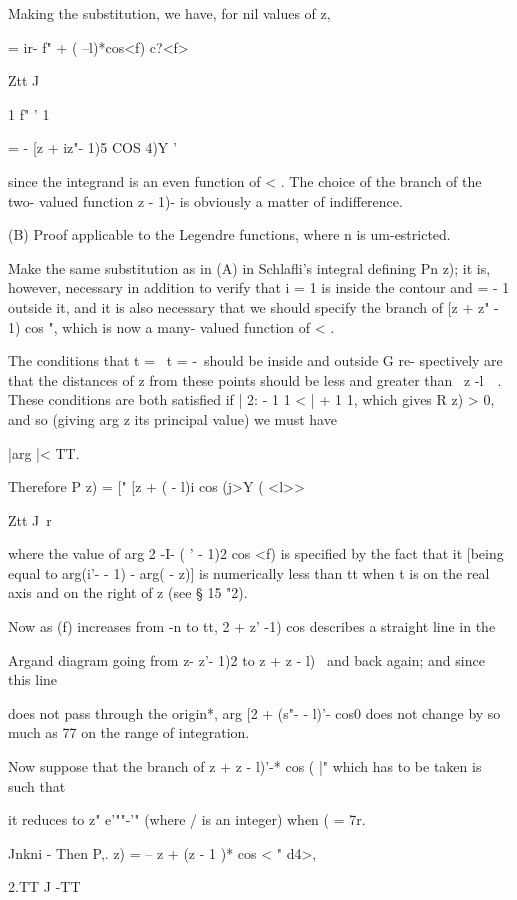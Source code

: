 {{%
%

Making the substitution, we have, for nil values of z,

= ir- f" + ( --l)*cos<f) c?<f>

Ztt J \

1 f" ' 1

= - [z + iz"- 1)5 COS 4)Y '

since the integrand is an even function of < . The choice of the
branch of the two- valued function z - 1)- is obviously a matter of
indifference.

(B) Proof applicable to the Legendre functions, where n is
um-estricted.

Make the same substitution as in (A) in Schlafli's integral defining
Pn z); it is, however, necessary in addition to verify that i = 1 is
inside the contour and = - 1 outside it, and it is also necessary that
we should specify the branch of [z + z" - 1) cos ", which is now a
many- valued function of < .

The conditions that t = \, t = -\ should be inside and outside G re-
spectively are that the distances of z from these points should be
less and greater than \ z -l\ \ . These conditions are both satisfied
if | 2: - 1 1 < | + 1 1, which gives R z) > 0, and so (giving arg z
its principal value) we must have

|arg |< TT.

Therefore P z) = [" [z + ( - l)i cos (j>Y ( <l>>

Ztt J \,r

where the value of arg 2 -I- ( ' - 1)2 cos <f) is specified by the
fact that it [being equal to arg(i'- - 1) - arg( - z)] is numerically
less than tt when t is on the real axis and on the right of z (see §
15 "2).

Now as (f) increases from -n to tt, 2 + z' -1) cos describes a
straight line in the

Argand diagram going from z- z'- 1)2 to z + z - l)~ and back again;
and since this line

does not pass through the origin*, arg [2 + (s"- - l)'- cos0 does not
change by so much as 77 on the range of integration.

Now suppose that the branch of z + z - l)'-* cos ( |" which has to be
taken is such that

it reduces to z" e'""-'" (where / is an integer) when ( = 7r.

Jnkni - Then P,. z) = -- z + (z - 1 )* cos < " d4>,

2.TT J -TT

}}
